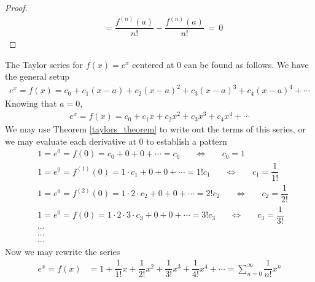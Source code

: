 \begin{theorem}
\begin{proof}
\begin{align*}
            &= \dfrac{f^{(n)}(a)}{n!} - \dfrac{f^{(n)}(a)}{n!} \hspace{2pt} = \hspace{2pt} 0
        \end{align*}
    \end{proof}
\end{theorem}

\begin{example}
The Taylor series for $f(x) = e^{x}$ centered at $0$ can be found as follows. We have the general setup
\begin{align*}
    e^{x} = f(x) = c_{0} + c_{1} (x - a) + c_{2} (x - a)^{2} + c_{3} (x - a)^{3} + c_{4} (x - a)^{4} + \cdots 
\end{align*}
Knowing that $a = 0$,
\begin{align*}
    e^{x} = f(x) = c_{0} + c_{1}x + c_{2}x^{2} + c_{3}x^{3} + c_{4}x^{4} + \cdots 
\end{align*}
We may use Theorem \ref{taylors_theorem} to write out the terms of this series, or we may evaluate each derivative at $0$ to establish a pattern
\begin{align*}
    &1 = e^{0} = f(0) = c_{0} + 0 + 0 + \cdots = c_{0} \hspace{20pt} \Longleftrightarrow \hspace{20pt} c_{0} = 1\\[2ex]
    &1 = e^{0} = f^{(1)}(0) = 1 \cdot c_{1} + 0 + 0 + \cdots = 1!c_{1} \hspace{20pt} \Longleftrightarrow \hspace{20pt} c_{1} = \dfrac{1}{1!}\\[2ex]
    &1 = e^{0} = f^{(2)}(0) = 1 \cdot 2 \cdot c_{2} + 0 + 0 + \cdots = 2!c_{2} \hspace{20pt} \Longleftrightarrow \hspace{20pt} c_{2} = \dfrac{1}{2!}\\[2ex]
    &1 = e^{0} = f(0) = 1 \cdot 2 \cdot 3 \cdot c_{3} + 0 + 0 + \cdots = 3!c_{3} \hspace{20pt} \Longleftrightarrow \hspace{20pt} c_{3} = \dfrac{1}{3!}\\[1ex]
    &\cdots\\[1ex]
    &\cdots\\[1ex]
    &\cdots
\end{align*}
Now we may rewrite the series
\begin{align*}
    e^{x} = f(x) &= 1 + \dfrac{1}{1!}x + \dfrac{1}{2!}x^{2} + \dfrac{1}{3!}x^{3} + \dfrac{1}{4!}x^{4} + \cdots = \sum_{n=0}^{\infty} \dfrac{1}{n!}x^{n}

\end{align*}
\end{example}
